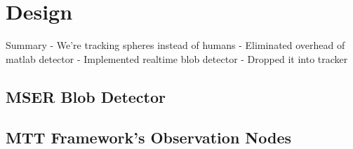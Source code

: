 \section{Design}
\label{sec:design}

Summary
- We're tracking spheres instead of humans
- Eliminated overhead of matlab detector
- Implemented realtime blob detector
- Dropped it into tracker

\subsection{MSER Blob Detector}

\subsection{MTT Framework's Observation Nodes}
